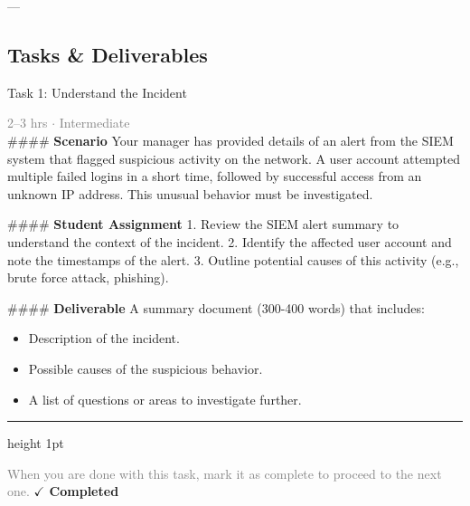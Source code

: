 \documentclass[10pt,a4paper]{article}
\begin{document}
---

\subsection*{Tasks \& Deliverables}

\begin{taskbox}{Task 1: Understand the Incident}

    {\small \textcolor{gray}{2--3 hrs $\cdot$ Intermediate}}\\[12pt]

    \#\#\#\# \textbf{Scenario}  
Your manager has provided details of an alert from the SIEM system that flagged suspicious activity on the network. A user account attempted multiple failed logins in a short time, followed by successful access from an unknown IP address. This unusual behavior must be investigated.

\#\#\#\# \textbf{Student Assignment}  
1. Review the SIEM alert summary to understand the context of the incident.  
2. Identify the affected user account and note the timestamps of the alert.  
3. Outline potential causes of this activity (e.g., brute force attack, phishing).  

\#\#\#\# \textbf{Deliverable}  
A summary document (300-400 words) that includes:  
\begin{itemize}
    \item Description of the incident.  
    \item Possible causes of the suspicious behavior.  
    \item A list of questions or areas to investigate further.\par
\end{itemize}

    \vspace{16pt}

    \textcolor{cardBorder}{\hrule height 1pt}\vspace{8pt}

    \small \textcolor{gray}{When you are done with this task, mark it as complete to proceed to the next one.} \hfill \textbf{\textcolor{brandDark}{$\checkmark$ Completed}}

\end{taskbox}
\end{document}
